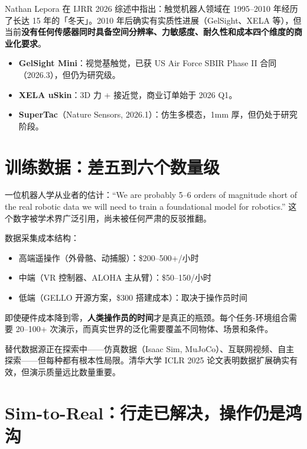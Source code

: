 Nathan Lepora 在 IJRR 2026 综述中指出\cite{lepora2026tactile}：触觉机器人领域在 1995--2010 年经历了长达 15 年的「冬天」。2010 年后确实有实质性进展（GelSight、XELA 等），但当前\textbf{没有任何传感器同时具备空间分辨率、力敏感度、耐久性和成本四个维度的商业化要求}。

\begin{itemize}
  \item \textbf{GelSight Mini}：视觉基触觉，已获 US Air Force SBIR Phase II 合同（2026.3），但仍为研究级\cite{gelsight2026sbir}。
  \item \textbf{XELA uSkin}：3D 力 + 接近觉，商业订单始于 2026 Q1\cite{xela2026orders}。
  \item \textbf{SuperTac}（Nature Sensors, 2026.1）：仿生多模态，1mm 厚，但仍处于研究阶段。
\end{itemize}

\section{训练数据：差五到六个数量级}

\begin{warnbox}
一位机器人学从业者的估计\cite{reddit2025roboticsdata}：``We are probably 5--6 orders of magnitude short of the real robotic data we will need to train a foundational model for robotics.'' 这个数字被学术界广泛引用，尚未被任何严肃的反驳推翻。
\end{warnbox}

数据采集成本结构\cite{gello2025,teleop2025costs}：

\begin{itemize}
  \item 高端遥操作（外骨骼、动捕服）：\$200--500+/小时
  \item 中端（VR 控制器、ALOHA 主从臂）：\$50--150/小时
  \item 低端（GELLO 开源方案，\$300 搭建成本）：取决于操作员时间
\end{itemize}

即使硬件成本降到零，\textbf{人类操作员的时间}才是真正的瓶颈。每个任务-环境组合需要 20--100+ 次演示，而真实世界的泛化需要覆盖不同物体、场景和条件。

替代数据源正在探索中——仿真数据（Isaac Sim, MuJoCo）、互联网视频、自主探索——但每种都有根本性局限。清华大学 ICLR 2025 论文\cite{tsinghua2025datascaling}表明数据扩展确实有效，但演示质量远比数量重要。

\section{Sim-to-Real：行走已解决，操作仍是鸿沟}


